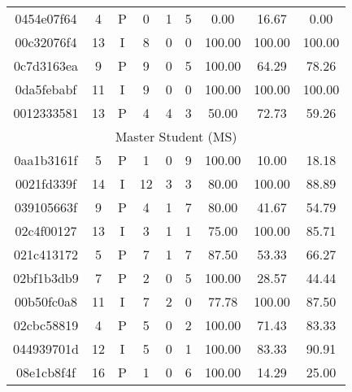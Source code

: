 \begin{table}[ht]
\begin{tabular}{cc|c|ccc|ccc}
0454e07f64  & 4     & P     & 0     & 1     &   5   & 0.00      & 16.67     & 0.00 \\
00c32076f4  & 13    & I     & 8     & 0     &   0   & 100.00    & 100.00    & 100.00 \\
0c7d3163ea  & 9     & P     & 9     & 0     &   5   & 100.00    & 64.29     & 78.26 \\
0da5febabf  & 11    & I     & 9     & 0     &   0   & 100.00    & 100.00    & 100.00 \\
0012333581  & 13    & P     & 4     & 4     &   3   & 50.00     & 72.73     & 59.26 \\
\midrule
\multicolumn{9}{c}{Master Student (MS)}\\
\midrule
0aa1b3161f  & 5     & P     & 1     & 0     &   9   & 100.00    & 10.00     & 18.18 \\
0021fd339f  & 14    & I     & 12    & 3     &   3   & 80.00     & 100.00    & 88.89 \\
039105663f  & 9     & P     & 4     & 1     &   7   & 80.00     & 41.67     & 54.79 \\
02c4f00127  & 13    & I     & 3     & 1     &   1   & 75.00     & 100.00    & 85.71 \\
021c413172  & 5     & P     & 7     & 1     &   7   & 87.50     & 53.33     & 66.27 \\
02bf1b3db9  & 7     & P     & 2     & 0     &   5   & 100.00    & 28.57     & 44.44 \\
00b50fc0a8  & 11    & I     & 7     & 2     &   0   & 77.78     & 100.00    & 87.50 \\
02cbc58819  & 4     & P     & 5     & 0     &   2   & 100.00    & 71.43     & 83.33 \\
044939701d  & 12    & I     & 5     & 0     &   1   & 100.00    & 83.33     & 90.91 \\
08e1cb8f4f  & 16    & P     & 1     & 0     &   6   & 100.00    & 14.29     & 25.00 \\
\bottomrule
\end{tabular}
\end{table}
